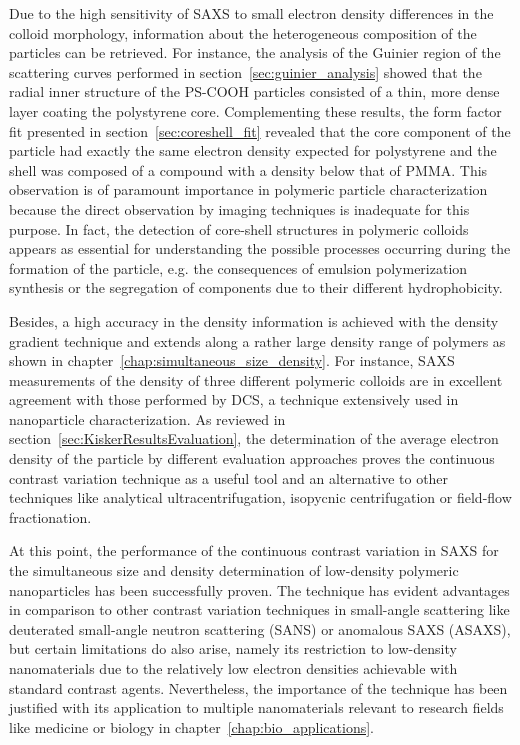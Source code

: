 Due to the high sensitivity of SAXS to small electron density differences in the colloid morphology, information about the heterogeneous composition of the particles can be retrieved. For instance, the analysis of the Guinier region of the scattering curves performed in section~\ref{sec:guinier_analysis} showed that the radial inner structure of the PS-COOH particles consisted of a thin, more dense layer coating the polystyrene core. Complementing these results, the form factor fit presented in section~\ref{sec:coreshell_fit} revealed that the core component of the particle had exactly the same electron  density expected for polystyrene and the shell was composed of a compound with a density below that of PMMA. This observation is of paramount importance in polymeric particle characterization because the direct observation by imaging techniques is inadequate for this purpose. In fact, the detection of core-shell structures in polymeric colloids appears as essential for understanding the possible processes occurring during the formation of the particle, e.g. the consequences of emulsion polymerization synthesis or the segregation of components due to their different hydrophobicity.

Besides, a high accuracy in the density information is achieved with the density gradient technique and extends along a rather large density range of polymers as shown in chapter~\ref{chap:simultaneous_size_density}. For instance, SAXS measurements of the density of three different polymeric colloids are in excellent agreement with those performed by DCS, a technique extensively used in nanoparticle characterization. As reviewed in section~\ref{sec:KiskerResultsEvaluation}, the determination of the average electron density of the particle by different evaluation approaches proves the continuous contrast variation technique as a useful tool and an alternative to other techniques like analytical ultracentrifugation, isopycnic centrifugation or field-flow fractionation.

At this point, the performance of the continuous contrast variation in SAXS for the simultaneous size and density determination of low-density polymeric nanoparticles has been successfully proven. The technique has evident advantages in comparison to other contrast variation techniques in small-angle scattering like deuterated small-angle neutron scattering (SANS) or anomalous SAXS (ASAXS), but certain limitations do also arise, namely its restriction to low-density nanomaterials due to the relatively low electron densities achievable with standard contrast agents. Nevertheless, the importance of the technique has been justified with its application to multiple nanomaterials relevant to research fields like medicine or biology in chapter~\ref{chap:bio_applications}.

